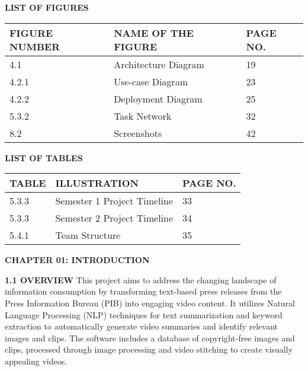 \documentclass[12pt]{article}
\begin{document}
\begin{center}  \fontsize{14}{14}\textbf{LIST OF FIGURES} 

\noindent \textbf{ }

\begin{tabular}{|p{1.3in}|p{3.0in}|p{0.8in}|} \hline
\fontsize{12}{12}\textbf{FIGURE NUMBER } & \fontsize{12}{12}\textbf{NAME OF THE FIGURE } & \fontsize{12}{12}\textbf{PAGE NO. } \\ \hline
4.1  &  Architecture Diagram & 19  \\ \hline
4.2.1 & Use-case Diagram & 23 \\ \hline
4.2.2 & Deployment Diagram & 25 \\ \hline
5.3.2 & Task Network & 32 \\ \hline
8.2 & Screenshots & 42 \\ \hline

\end{tabular}
 \end{center}


\pagebreak

\begin{center}  \fontsize{14}{14}\textbf{LIST OF TABLES} 

\noindent \textbf{ }

\begin{tabular}{|p{1.3in}|p{3.0in}|p{0.8in}|} \hline
\fontsize{12}{12}\textbf{TABLE } & \fontsize{12}{12}\textbf{ILLUSTRATION } & \fontsize{12}{12}\textbf{PAGE NO. } \\ \hline
5.3.3 & Semester 1 Project Timeline & 33 \\ \hline
5.3.3 & Semester 2 Project Timeline & 34 \\ \hline
5.4.1 & Team Structure & 35 \\ \hline

\end{tabular}
 \end{center}


\pagebreak

\begin{center} \fontsize{14}{14}\textbf {CHAPTER 01: INTRODUCTION } \end{center}


\noindent \fontsize{12}{12}\textbf{1.1 OVERVIEW}
\justify      
\hspace{5mm} 
This project aims to address the changing landscape of information consumption by transforming text-based press releases from the Press Information Bureau (PIB) into engaging video content. It utilizes Natural Language Processing (NLP) techniques for text summarization and keyword extraction to automatically generate video summaries and identify relevant images and clips. The software includes a database of copyright-free images and clips, processed through image processing and video stitching to create visually appealing videos.\\
\end{document}
